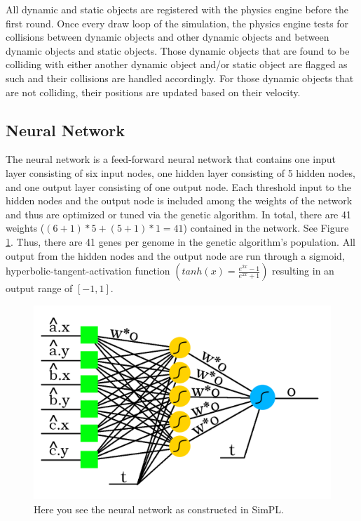 \documentclass[a4paper,10pt]{article}
\begin{document}
All dynamic and static objects are registered with the physics engine before the first round. Once every draw loop of the simulation, the physics engine tests for collisions between dynamic objects and other dynamic objects and between dynamic objects and static objects. Those dynamic objects that are found to be colliding with either another dynamic object and/or static object are flagged as such and their collisions are handled accordingly. For those dynamic objects that are not colliding, their positions are updated based on their velocity.

\subsection{Neural Network}

The neural network is a feed-forward neural network that contains one input layer consisting of six input nodes, one hidden layer consisting of 5 hidden nodes, and one output layer consisting of one output node. Each threshold input to the hidden nodes and the output node is included among the weights of the network and thus are optimized or tuned via the genetic algorithm. In total, there are 41 weights ($(6+1)*5+(5+1)*1=41$) contained in the network. See Figure \ref{fig:nn}. Thus, there are 41 genes per genome in the genetic algorithm's population. All output from the hidden nodes and the output node are run through a sigmoid, hyperbolic-tangent-activation function $\left ( tanh(x)=\frac{e^{2x}-1}{e^{2x}+1} \right )$ resulting in an output range of $[-1,1]$.

\begin{figure}[H]  
  \centering
  \includegraphics[width=1\textwidth]{figures/nn.png}
  \caption{Here you see the neural network as constructed in SimPL.}
  \label{fig:nn}
\end{figure}
\end{document}
